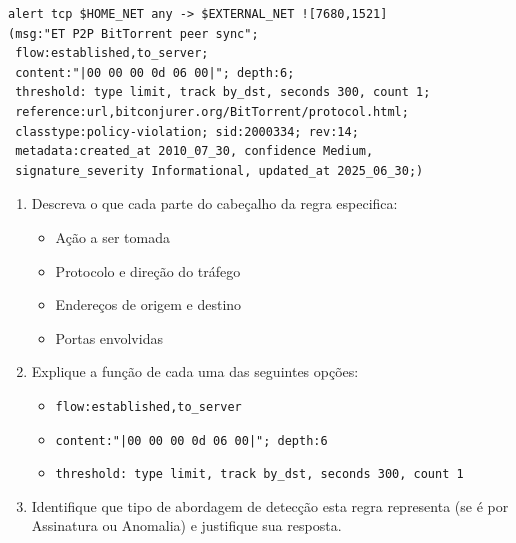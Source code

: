 \begin{verbatim}
alert tcp $HOME_NET any -> $EXTERNAL_NET ![7680,1521] 
(msg:"ET P2P BitTorrent peer sync"; 
 flow:established,to_server; 
 content:"|00 00 00 0d 06 00|"; depth:6; 
 threshold: type limit, track by_dst, seconds 300, count 1; 
 reference:url,bitconjurer.org/BitTorrent/protocol.html; 
 classtype:policy-violation; sid:2000334; rev:14; 
 metadata:created_at 2010_07_30, confidence Medium, 
 signature_severity Informational, updated_at 2025_06_30;)
\end{verbatim}

\begin{enumerate}
    \item Descreva o que cada parte do cabeçalho da regra especifica:
          \begin{itemize}
              \item     Ação a ser tomada
              \item    Protocolo e direção do tráfego
              \item     Endereços de origem e destino
              \item     Portas envolvidas
          \end{itemize}
    \item  Explique a função de cada uma das seguintes opções:
          \begin{itemize}
              \item   \texttt{flow:established,to\_server}
              \item   \texttt{content:"|00 00 00 0d 06 00|"; depth:6}
              \item   \texttt{threshold: type limit, track by\_dst, seconds 300, count 1}
          \end{itemize}
    \item Identifique que tipo de abordagem de detecção esta regra representa (se é por Assinatura ou Anomalia) e justifique sua resposta.
\end{enumerate}

